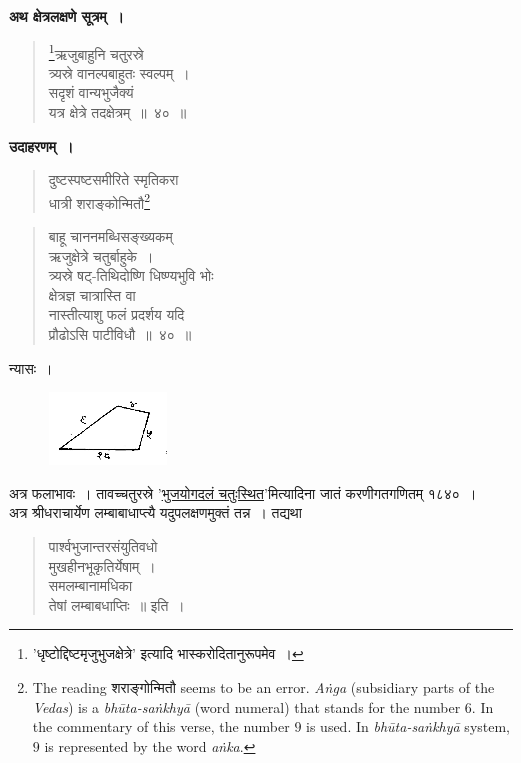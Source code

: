 \documentclass[11pt, openany]{book}
\begin{document}
\setcounter{footnote}{0}
\textbf{ अथ क्षेत्रलक्षणे सूत्रम्~। }
\begin{quote}
    \bs 
     \footnote{'{\color{violet}धृष्टोद्दिष्टमृजुभुजक्षेत्रे}' इत्यादि {\color{violet}भास्करो}दितानुरूपमेव~।}ऋजुबाहुनि चतुरस्रे \\
     त्र्यस्रे वानल्पबाहुतः स्वल्पम्~।\\
सदृशं वान्यभुजैक्यं \\
यत्र क्षेत्रे तदक्षेत्रम्~॥~४०~॥
\end{quote}

 \textbf{उदाहरणम्~।} 
\begin{quote}
    \bqt 
     दुष्टस्पष्टसमीरिते स्मृतिकरा \\
     धात्री शराङ्कोन्मितौ\footnote{The reading शराङ्गोन्मितौ seems to be an error. \textit{Aṅga} (subsidiary parts of the \textit{Vedas}) is a \textit{bhūta-saṅkhyā} (word numeral) that stands for the number $6$. In the commentary of this verse, the number $9$ is used. In \textit{bhūta-saṅkhyā} system, $9$ is represented by the word \textit{aṅka}.}
\end{quote}
\newpage%

\begin{quote}
    \bqt 
 बाहू चाननमब्धिसङ्ख्यकम्\\
 ऋजुक्षेत्रे चतुर्बाहुके~।\\
त्र्यस्रे षट्-तिथिदोष्णि धिष्ण्यभुवि भोः \\
क्षेत्रज्ञ चात्रास्ति वा\\
नास्तीत्याशु फलं प्रदर्शय यदि \\
प्रौढोऽसि पाटीविधौ~॥~४०~॥
\end{quote}

 न्यासः~। 
\begin{figure}[h!]
    \centering
    \includegraphics[scale=0.85]{graphics/capture46.png}
\end{figure}

 अत्र फलाभावः~। तावच्चतुरस्रे '\hyperref[4.33]{भुजयोगदलं चतुःस्थित}'मित्यादिना जातं करणीगतगणितम् १८४०~। \\

\vspace{-2mm}
 अत्र {\color{violet}श्रीधराचार्येण} लम्बाबाधाप्त्यै यदुपलक्षणमुक्तं तन्न~। 
तद्यथा\textendash\ 
\begin{quote}
    {\bq 
    पार्श्वभुजान्तरसंयुतिवधो \\
    मुखहीनभूकृतिर्येषाम्~।\\
समलम्बानामधिका \\
तेषां लम्बाबधाप्तिः~॥} इति~।
\end{quote}
 
\end{document}

